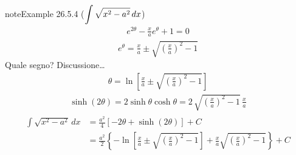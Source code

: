 \documentclass[letterpaper,10pt,italian]{jupyterBook}
\begin{document}
\begin{sphinxadmonition}{note}{Example 26.5.4 (\protect\(\displaystyle \int \sqrt{x^2 - a^2} \,  dx\protect\))}
\begin{equation*}
\begin{split}e^{2 \theta} - \frac{x}{a} e^{\theta} + 1 = 0\end{split}
\end{equation*}\begin{equation*}
\begin{split}e^{\theta} 
  = \frac{x}{a} \pm \sqrt{\left( \frac{x}{a} \right)^2 - 1}
\end{split}
\end{equation*}
\sphinxAtStartPar
{} Quale segno? Discussione… 
\begin{equation*}
\begin{split}\theta = \ln \left[ \frac{x}{a} \pm \sqrt{\left( \frac{x}{a} \right)^2 - 1} \right]\end{split}
\end{equation*}\begin{equation*}
\begin{split}\sinh (2 \theta) = 2 \sinh \theta \cosh \theta = 2 \, \sqrt{\left(\frac{x}{a}\right)^2 - 1} \, \frac{x}{a}\end{split}
\end{equation*}\begin{equation*}
\begin{split}\begin{aligned}
  \int \sqrt{x^2 - a^2} \, dx
   & = \frac{a^2}{4} \left[ -2 \theta + \sinh \left( 2 \theta \right) \right] + C \\
   & = \frac{a^2}{2} \left\{ -\ln \left[ \frac{x}{a}  \pm  \sqrt{\left( \frac{x}{a} \right)^2 - 1} \right] + \frac{x}{a} \sqrt{ \left(\frac{x}{a}\right)^2 - 1} \right\} + C
\end{aligned}\end{split}
\end{equation*}\end{sphinxadmonition}
\label{ch/infinitesimal_calculus/integrals:integrals-methods-sub-4}
\end{document}
